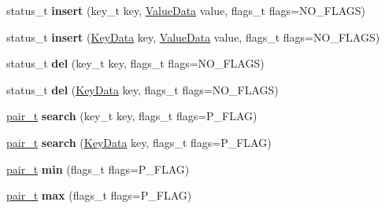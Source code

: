 \begin{DoxyCompactItemize}
status\+\_\+t {\bfseries insert} (key\+\_\+t key, \hyperlink{class_s_p_u_1_1_fields_data}{Value\+Data} value, flags\+\_\+t flags=N\+O\+\_\+\+F\+L\+A\+GS)
\item 
\mbox{\label{class_s_p_u_1_1_structure_a9e104419b60f39753c5c28612b7114cf}} 
status\+\_\+t {\bfseries insert} (\hyperlink{class_s_p_u_1_1_fields_data}{Key\+Data} key, \hyperlink{class_s_p_u_1_1_fields_data}{Value\+Data} value, flags\+\_\+t flags=N\+O\+\_\+\+F\+L\+A\+GS)
\item 
\mbox{\label{class_s_p_u_1_1_structure_a6f02f8920af440d35dae6033ee43c1ff}} 
status\+\_\+t {\bfseries del} (key\+\_\+t key, flags\+\_\+t flags=N\+O\+\_\+\+F\+L\+A\+GS)
\item 
\mbox{\label{class_s_p_u_1_1_structure_a2b032f6a655aa3133bdcc2bc2bfb8353}} 
status\+\_\+t {\bfseries del} (\hyperlink{class_s_p_u_1_1_fields_data}{Key\+Data} key, flags\+\_\+t flags=N\+O\+\_\+\+F\+L\+A\+GS)
\item 
\mbox{\label{class_s_p_u_1_1_structure_a97c83eb715f31cebd64b52601a80286a}} 
\hyperlink{struct_s_p_u_1_1pair__containter}{pair\+\_\+t} {\bfseries search} (key\+\_\+t key, flags\+\_\+t flags=P\+\_\+\+F\+L\+AG)
\item 
\mbox{\label{class_s_p_u_1_1_structure_a0693f4b7028f1ea3dc58ddf7a039e49b}} 
\hyperlink{struct_s_p_u_1_1pair__containter}{pair\+\_\+t} {\bfseries search} (\hyperlink{class_s_p_u_1_1_fields_data}{Key\+Data} key, flags\+\_\+t flags=P\+\_\+\+F\+L\+AG)
\item 
\mbox{\label{class_s_p_u_1_1_structure_a7da5feeec46c1022b0372b5e0b7ed876}} 
\hyperlink{struct_s_p_u_1_1pair__containter}{pair\+\_\+t} {\bfseries min} (flags\+\_\+t flags=P\+\_\+\+F\+L\+AG)
\item 
\mbox{\label{class_s_p_u_1_1_structure_ae0a0e396a6a0ea5017372a76bf223d4c}} 
\hyperlink{struct_s_p_u_1_1pair__containter}{pair\+\_\+t} {\bfseries max} (flags\+\_\+t flags=P\+\_\+\+F\+L\+AG)
\item 
\mbox{\label{class_s_p_u_1_1_structure_ad4f8e7b76d663328555564609135aa2e}} 

\end{DoxyCompactItemize}
